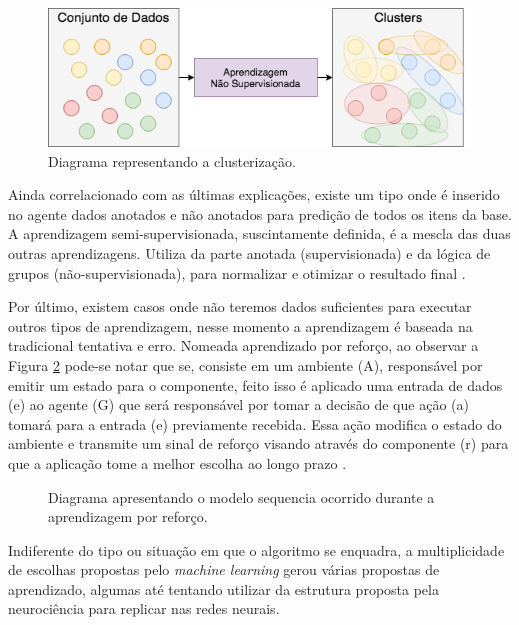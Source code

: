 \begin{figure}[!h]
    \centering
    \includegraphics[width=.8\textwidth]{imagens/unsupervised.png}
    \caption{Diagrama representando a clusterização.}
    \label{fig:unsupervised}
\end{figure}

Ainda correlacionado com as últimas explicações, existe um tipo onde é inserido no agente dados anotados e não anotados para predição de todos os itens da base. A aprendizagem semi-supervisionada, suscintamente definida, é a mescla das duas outras aprendizagens. Utiliza da parte anotada (supervisionada) e da lógica de grupos (não-supervisionada), para normalizar e otimizar o resultado final \cite[7]{mohri2012foundations}.

Por último, existem casos onde não teremos dados suficientes para executar outros tipos de aprendizagem, nesse momento a aprendizagem é baseada na tradicional tentativa e erro. Nomeada aprendizado por reforço, ao observar a Figura \ref{fig:reinforcement} pode-se notar que se, consiste em um ambiente (A), responsável por emitir um estado para o componente, feito isso é aplicado uma entrada de dados (e) ao agente (G) que será responsável por tomar a decisão de que ação (a) tomará para a entrada (e) previamente recebida. Essa ação modifica o estado do ambiente e transmite um sinal de reforço visando através do componente (r) para que a aplicação tome a melhor escolha ao longo prazo \cite{kaelbling1996reinforcement, russell2003artificial}.

\begin{figure}[!h]
    \centering
    \caption{Diagrama apresentando o modelo sequencia ocorrido durante a aprendizagem por reforço.}
    \label{fig:reinforcement}
\end{figure}

Indiferente do tipo ou situação em que o algoritmo se enquadra, a multiplicidade de escolhas propostas pelo \textit{machine learning} gerou várias propostas de aprendizado, algumas até tentando utilizar da estrutura proposta pela neurociência para replicar nas redes neurais.

